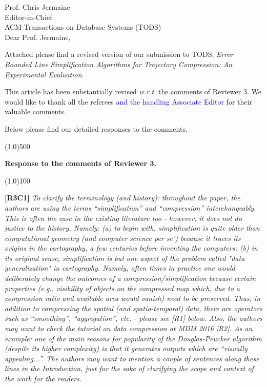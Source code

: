 \documentclass{letter}
\newcommand{\wrt}{\emph{w.r.t.}\xspace}
\begin{document}
Prof. {Chris Jermaine} \\
Editor-in-Chief		\\
ACM Transactions on Database Systems (TODS)	\\



Dear Prof. Jermaine,

Attached please find a revised version of our submission to TODS, \emph{Error Bounded Line Simplification Algorithms for Trajectory Compression: An Experimental Evaluation}.


This article has been substantially revised \wrt the comments of Reviewer 3.
We would like to thank all the referees \textcolor{blue}{and the handling Associate Editor} for their valuable comments.

Below please find our detailed responses to the comments.





\line(1,0){500}

\textbf{Response to the comments of Reviewer 3.}

\line(1,0){100}

\textbf{[R3C1]} \emph{
To clarify the terminology (and history): throughout the paper, the authors are using the terms ``simplification'' and ``compression'' interchangeably. This is often the case in the existing literature too - however, it does not do justice to the history. Namely: (a) to begin with, simplification is quite older than computational geometry (and computer science per se') because it traces its origins in the cartography, a few centuries before inventing the computers; (b) in its original sense, simplification is but one aspect of the problem called "data generalization" in cartography. Namely, often times in practice one would deliberately change the outcomes of a compression/simplification because certain properties (e.g., visibility of objects on the compressed map which, due to a compression ratio and available area would vanish) need to be preserved. Thus, in addition to compressing the spatial (and spatio-temporal) data, there are operators such as ``smoothing'', ``aggregation'', etc. - please see [R1] below. Also, the authors may want to check the tutorial on data compression at MDM 2016 [R2]. As an example: one of the main reasons for popularity of the Douglas-Peucker algorithm (despite its higher complexity) is that it generates outputs which are ``visually appealing...''.}
%
\emph{The authors may want to mention a couple of sentences along these lines in the Introduction, just for the sake of clarifying the scope and context of the work for the readers.}
\end{document}
